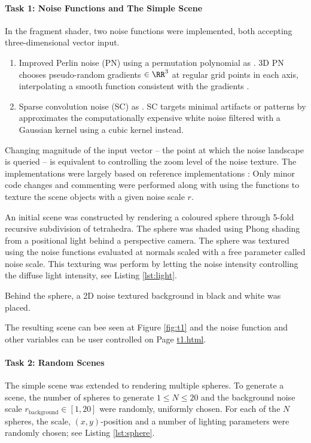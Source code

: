 \documentclass[12pt,fleqn]{article}
\begin{document}
\paragraph{Task 1: Noise Functions and The Simple Scene}
In the fragment shader, two noise functions were implemented, both accepting three-dimensional vector input.
\begin{enumerate}
    \item Improved Perlin noise (PN) using a permutation polynomial as \citeauthor{mcewan2012efficient} \cite{mcewan2012efficient}. 3D PN chooses pseudo-random gradients $\in \RR^3$ at regular grid points in each axis, interpolating a smooth function consistent with the gradients \cite{gustavson2005simplex}. 
    \item Sparse convolution noise (SC) as \citeauthor{frisvad2007fast} \cite{frisvad2007fast}. SC targets minimal artifacts or patterns by approximates the computationally expensive white noise filtered with a Gaussian kernel using a cubic kernel instead.
\end{enumerate}
Changing magnitude of the input vector -- the point at which the noise landscape is queried -- is equivalent to controlling the zoom level of the noise texture.
The implementations were largely based on reference implementations \cite{frisvad2016exploring}:
Only minor code changes and commenting were performed along with using the functions to texture the scene objects with a given noise scale $r$.

An initial scene was constructed by rendering a coloured sphere through 5-fold recursive subdivision of tetrahedra.
The sphere was shaded using Phong shading from a positional light behind a perspective camera.
The sphere was textured using the noise functions evaluated at normals scaled with a free parameter called noise scale.
This texturing was perform by letting the noise intensity controlling the diffuse light intensity, see Listing \ref{lst:light}.

Behind the sphere, a 2D noise textured background in black and white was placed.

The resulting scene can bee seen at Figure \ref{fig:t1} and the noise function and other variables can be user controlled on Page \href{file:///home/sorenmulli/Nextcloud/cand2/computer-graphics/afl/webgl-site/t1.html}{t1.html}.


\paragraph{Task 2: Random Scenes}
The simple scene was extended to rendering multiple spheres.
To generate a scene, the number of spheres to generate $1 \le N \le 20 $ and the background noise scale $r_\text{background} \in [1, 20]$ were randomly, uniformly chosen.
For each of the $N$ spheres, the scale, $(x, y)$-position and a number of lighting parameters were randomly chosen; see Listing \ref{lst:sphere}.
\end{document}
